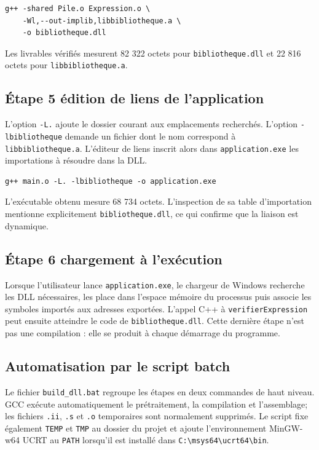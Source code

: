\documentclass[11pt,a4paper]{article}
\newcommand{\fichier}[1]{\texttt{#1}}
\begin{document}
\begin{lstlisting}[style=console,caption={Création de la DLL et de sa bibliothèque d'importation}]
g++ -shared Pile.o Expression.o \
    -Wl,--out-implib,libbibliotheque.a \
    -o bibliotheque.dll
\end{lstlisting}

Les livrables vérifiés mesurent 82 322 octets pour \fichier{bibliotheque.dll} et 22 816 octets pour \fichier{libbibliotheque.a}.

\subsection{Étape 5 édition de liens de l'application}

L'option \texttt{-L.} ajoute le dossier courant aux emplacements recherchés. L'option \texttt{-lbibliotheque} demande un fichier dont le nom correspond à \fichier{libbibliotheque.a}. L'éditeur de liens inscrit alors dans \fichier{application.exe} les importations à résoudre dans la DLL.

\begin{lstlisting}[style=console,caption={Création de l'exécutable}]
g++ main.o -L. -lbibliotheque -o application.exe
\end{lstlisting}

L'exécutable obtenu mesure 68 734 octets. L'inspection de sa table d'importation mentionne explicitement \fichier{bibliotheque.dll}, ce qui confirme que la liaison est dynamique.

\subsection{Étape 6 chargement à l'exécution}

Lorsque l'utilisateur lance \fichier{application.exe}, le chargeur de Windows recherche les DLL nécessaires, les place dans l'espace mémoire du processus puis associe les symboles importés aux adresses exportées. L'appel C++ à \texttt{verifierExpression} peut ensuite atteindre le code de \fichier{bibliotheque.dll}. Cette dernière étape n'est pas une compilation : elle se produit à chaque démarrage du programme.

\subsection{Automatisation par le script batch}

Le fichier \fichier{build\_dll.bat} regroupe les étapes en deux commandes de haut niveau. GCC exécute automatiquement le prétraitement, la compilation et l'assemblage; les fichiers \fichier{.ii}, \fichier{.s} et \fichier{.o} temporaires sont normalement supprimés. Le script fixe également \texttt{TEMP} et \texttt{TMP} au dossier du projet et ajoute l'environnement MinGW-w64 UCRT au \texttt{PATH} lorsqu'il est installé dans \fichier{C:\textbackslash msys64\textbackslash ucrt64\textbackslash bin}.
\end{document}
